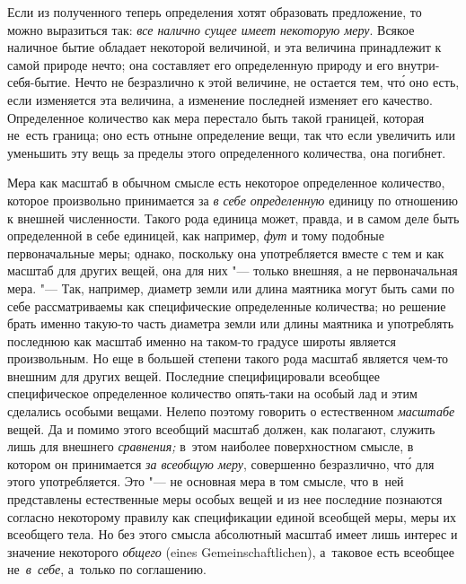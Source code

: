 Если из полученного теперь определения хотят образовать предложение, то можно
выразиться так: {\em все налично сущее имеет некоторую меру}. Всякое наличное
бытие обладает некоторой величиной, и эта величина принадлежит к самой природе
нечто; она составляет его определенную природу и его внутри-себя-бытие. Нечто
не безразлично к этой величине, не остается тем, чт\'{о} оно есть, если
изменяется эта величина, а изменение последней изменяет его качество.
Определенное количество как мера перестало быть такой границей, которая не~есть
граница; оно есть отныне определение вещи, так что если увеличить или уменьшить
эту вещь за пределы этого определенного количества, она погибнет.

Мера как масштаб в обычном смысле есть некоторое определенное количество,
которое произвольно принимается за {\em в себе определенную} единицу по
отношению к внешней численности. Такого рода единица может, правда, и в самом
деле быть определенной в себе единицей, как например,
{\em фут} и тому подобные первоначальные
меры; однако, поскольку она употребляется вместе с тем и как масштаб для других
вещей, она для них "--- только внешняя, а не первоначальная мера. "--- Так,
например, диаметр земли или длина маятника могут быть сами по себе
рассматриваемы как специфические определенные количества; но решение брать
именно такую-то часть диаметра земли или длины маятника и употреблять последнюю
как масштаб именно на таком-то градусе широты является произвольным. Но еще в
большей степени такого рода масштаб является чем-то внешним для других вещей.
Последние специфицировали всеобщее специфическое определенное количество
опять-таки на особый лад и этим сделались особыми вещами. Нелепо поэтому
говорить о естественном {\em масштабе} вещей. Да и помимо этого всеобщий
масштаб должен, как полагают, служить лишь для внешнего {\em сравнения;} в~этом
наиболее поверхностном смысле, в котором он принимается {\em за всеобщую меру},
совершенно безразлично, чт\'{о} для этого употребляется. Это "--- не основная
мера в том смысле, что в~ней представлены естественные меры особых вещей и из
нее последние познаются согласно некоторому правилу как спецификации единой
всеобщей меры, меры их всеобщего тела. Но без этого смысла абсолютный масштаб
имеет лишь интерес и значение некоторого {\em общего}
(eines Gemein\-schaft\-li\-chen), а~таковое есть всеобщее
не~{\em в~себе}, а~только по соглашению.

